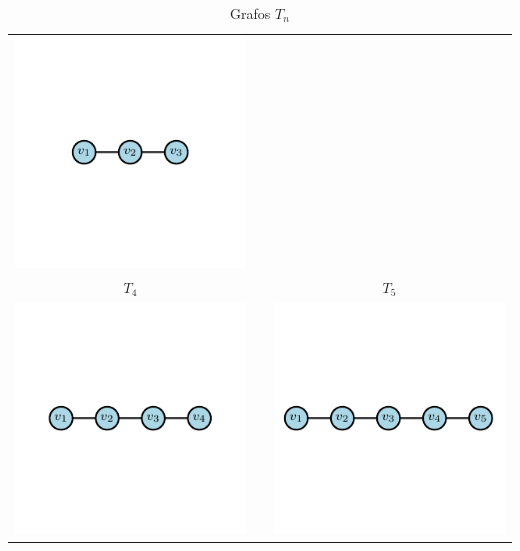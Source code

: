 \begin{table}[H]
\begin{center}
\begin{tabular}{ccc}
                    \includegraphics{Sections/Graphs/GraphsImages/GraphsTn/T3.pdf}
                    \\
                    \textbf{$T_4$} &  & \textbf{$T_5$} \\
                    \includegraphics{Sections/Graphs/GraphsImages/GraphsTn/T4.pdf}
                    &
                    &
                    \includegraphics{Sections/Graphs/GraphsImages/GraphsTn/T5.pdf}
                \end{tabular}
              \caption{Grafos $T_n$}
              \label{tbl:grafosTn}
            \end{center}
        \end{table}
